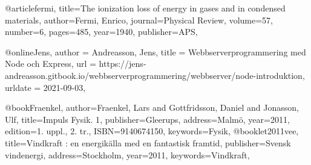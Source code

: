 @article{fermi,
title={The ionization loss of energy in gases and in condensed materials},
author={Fermi, Enrico},
journal={Physical Review},
volume={57},
number={6},
pages={485},
year={1940},
publisher={APS},
}

@online{Jens,
author = {Andreasson, Jens},
title = {Webbserverprogrammering med Node och Express},
url = {https://jens-andreasson.gitbook.io/webbserverprogrammering/webbserver/node-introduktion},
urldate = {2021-09-03},
}

@book{Fraenkel,
author={Fraenkel, Lars and Gottfridsson, Daniel and Jonasson, Ulf},
title={Impuls Fysik. 1},
publisher={Gleerups},
address={Malm{\"o}},
year={2011},
edition={1. uppl., 2. tr.},
ISBN={9140674150},
keywords={Fysik},
}
@booklet{2011vee,
title={Vindkraft : en energik{\"a}lla med en fantastisk framtid},
publisher={Svensk vindenergi},
address={Stockholm},
year={2011},
keywords={Vindkraft},
}